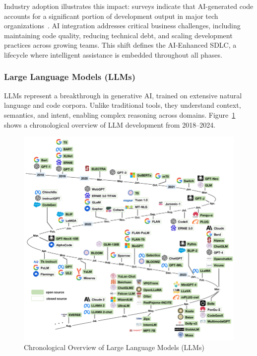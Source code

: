 \begin{spacing}{1.2}
Industry adoption illustrates this impact: surveys indicate that AI-generated code accounts for a significant portion of development output in major tech organizations~\cite{google2024ai_code, google2024developer_survey}. AI integration addresses critical business challenges, including maintaining code quality, reducing technical debt, and scaling development practices across growing teams. This shift defines the AI-Enhanced SDLC, a lifecycle where intelligent assistance is embedded throughout all phases.

\subsubsection*{Large Language Models (LLMs)}
LLMs represent a breakthrough in generative AI, trained on extensive natural language and code corpora. Unlike traditional tools, they understand context, semantics, and intent, enabling complex reasoning across domains. Figure~\ref{fig:llm_overview} shows a chronological overview of LLM development from 2018–2024.

\begin{figure}[H]
    \centering
    \includegraphics[scale=1]{Images/A-chronological-overview-of-large-language-models-LLMs-multimodal-and-scientific.png}
    \caption{Chronological Overview of Large Language Models (LLMs)}
    \label{fig:llm_overview}
\end{figure}


\end{spacing}
